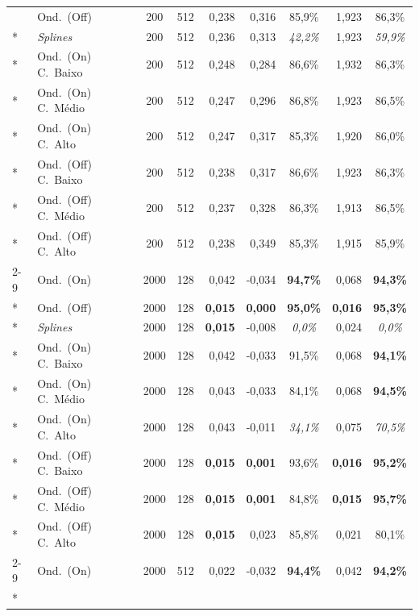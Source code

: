 {\begin{longtable}{@{}llccrrcrc@{}}
   & Ond.\ (Off) & 200 & 512 & 0{,}238 & 0{,}316 & 85{,}9\% & 1{,}923 & 86{,}3\% \\*
   & \emph{Splines} & 200 & 512 & 0{,}236 & 0{,}313 & \textit{42{,2\%}} & 1{,}923 & \textit{59{,9\%}} \\*
   & Ond.\ (On) C.\ Baixo & 200 & 512 & 0{,}248 & 0{,}284 & 86{,}6\% & 1{,}932 & 86{,}3\% \\*
   & Ond.\ (On) C.\ Médio & 200 & 512 & 0{,}247 & 0{,}296 & 86{,}8\% & 1{,}923 & 86{,}5\% \\*
   & Ond.\ (On) C.\ Alto & 200 & 512 & 0{,}247 & 0{,}317 & 85{,}3\% & 1{,}920 & 86{,}0\% \\*
   & Ond.\ (Off) C.\ Baixo & 200 & 512 & 0{,}238 & 0{,}317 & 86{,}6\% & 1{,}923 & 86{,}3\% \\*
   & Ond.\ (Off) C.\ Médio & 200 & 512 & 0{,}237 & 0{,}328 & 86{,}3\% & 1{,}913 & 86{,}5\% \\*
   & Ond.\ (Off) C.\ Alto & 200 & 512 & 0{,}238 & 0{,}349 & 85{,}3\% & 1{,}915 & 85{,}9\% \\
  \cmidrule{2-9}
  \multirow{9}{*}{\rotatebox[origin=c]{90}{Doppler}} & Ond.\ (On) & 2000 & 128 & 0{,}042 & -0{,}034 & \textbf{94{,7\%}} & 0{,}068 & \textbf{94{,3\%}} \\*
   & Ond.\ (Off) & 2000 & 128 & \textbf{0{,015}} & \textbf{0{,000}} & \textbf{95{,0\%}} & \textbf{0{,016}} & \textbf{95{,3\%}} \\*
   & \emph{Splines} & 2000 & 128 & \textbf{0{,015}} & -0{,}008 & \textit{0{,0\%}} & 0{,}024 & \textit{0{,0\%}} \\*
   & Ond.\ (On) C.\ Baixo & 2000 & 128 & 0{,}042 & -0{,}033 & 91{,}5\% & 0{,}068 & \textbf{94{,1\%}} \\*
   & Ond.\ (On) C.\ Médio & 2000 & 128 & 0{,}043 & -0{,}033 & 84{,}1\% & 0{,}068 & \textbf{94{,5\%}} \\*
   & Ond.\ (On) C.\ Alto & 2000 & 128 & 0{,}043 & -0{,}011 & \textit{34{,1\%}} & 0{,}075 & \textit{70{,5\%}} \\*
   & Ond.\ (Off) C.\ Baixo & 2000 & 128 & \textbf{0{,015}} & \textbf{0{,001}} & 93{,}6\% & \textbf{0{,016}} & \textbf{95{,2\%}} \\*
   & Ond.\ (Off) C.\ Médio & 2000 & 128 & \textbf{0{,015}} & \textbf{0{,001}} & 84{,}8\% & \textbf{0{,015}} & \textbf{95{,7\%}} \\*
   & Ond.\ (Off) C.\ Alto & 2000 & 128 & \textbf{0{,015}} & 0{,}023 & 85{,}8\% & 0{,}021 & 80{,}1\% \\
  \cmidrule{2-9}
  \multirow{9}{*}{\rotatebox[origin=c]{90}{Doppler}} & Ond.\ (On) & 2000 & 512 & 0{,}022 & -0{,}032 & \textbf{94{,4\%}} & 0{,}042 & \textbf{94{,2\%}} \\*

\end{longtable}}
